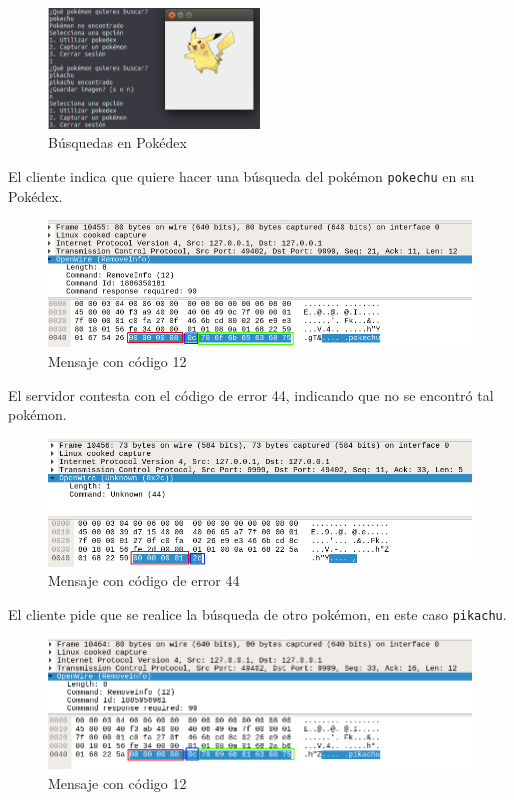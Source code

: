 \documentclass[12pt]{article}
\begin{document}
\begin{figure}[H]
  \centering
  \includegraphics[width=0.5\textwidth]{07}
  \caption{Búsquedas en Pokédex}
\end{figure}

El cliente indica que quiere hacer una búsqueda del pokémon \texttt{pokechu} en su Pokédex.
\begin{figure}[H]
  \centering
  \includegraphics[width=\textwidth]{09}
  \caption{Mensaje con código 12}
\end{figure}

El servidor contesta con el código de error 44, indicando que no se encontró tal pokémon.
\begin{figure}[H]
  \centering
  \includegraphics[width=\textwidth]{10}
  \caption{Mensaje con código de error 44}
\end{figure}

El cliente pide que se realice la búsqueda de otro pokémon, en este caso \texttt{pikachu}.

\begin{figure}[H]
  \centering
  \includegraphics[width=\textwidth]{11}
  \caption{Mensaje con código 12}
\end{figure}
\end{document}
